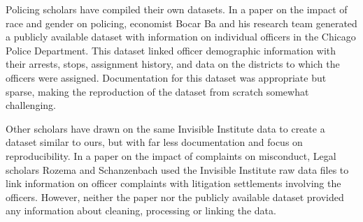Policing scholars have compiled their own datasets. In a paper on the impact of
race and gender on policing, economist Bocar Ba and his research team generated
a publicly available dataset with information on individual officers in the
Chicago Police Department. This dataset linked officer demographic information
with their arrests, stops, assignment history, and data on the districts to
which the officers were assigned. Documentation for this dataset was
appropriate but sparse, making the reproduction of the dataset from scratch
somewhat challenging.

Other scholars have drawn on the same Invisible Institute data to create
a dataset similar to ours, but with far less documentation and focus on
reproducibility. In a paper on the impact of complaints on misconduct, Legal
scholars Rozema and Schanzenbach used the Invisible Institute raw data files to
link information on officer complaints with litigation settlements involving
the officers. However, neither the paper nor the publicly available dataset
provided any information about cleaning, processing or linking the data. 
